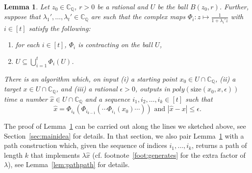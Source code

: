 \documentclass[11pt]{article}
\newtheorem{lemma}[theorem]{Lemma}
\def\CQ{\mathbb{C}_{\mathbb{Q}}}
\newcommand{\size}[1]{\mathrm{size}(#1)}
\newcommand{\eps}{\epsilon}
\begin{document}
\newcommand{\statelemprecision}{Let $z_0\in \CQ$, $r>0$ be a rational and $U$ be the ball $B(z_0,r)$. Further, suppose that   $\lambda_1',\hdots,\lambda_t'\in \CQ$ are such that the complex maps $\Phi_i:z\mapsto \frac{1}{1+\lambda_i' z}$ with $i\in[t]$ satisfy the following:
\begin{enumerate}
\item for each $i\in[t]$, $\Phi_i$ is contracting on  the ball $U$,
\item $U\subseteq \bigcup^{t}_{i=1}\Phi_i(U)$.
\end{enumerate}
There is an algorithm which, on input (i) a starting point $x_0\in U\cap \CQ$, (ii) a target $x\in U\cap \CQ$,  and (iii) a rational $\epsilon>0$, outputs in $poly(\size{x_0,x,\eps})$ time a number $\hat{x}\in U\cap \CQ$ and  a sequence $i_1,i_2,\hdots,i_k\in [t]$ such that  
\[\hat{x}=\Phi_{i_k}(\Phi_{i_{k-1}}(\cdots\Phi_{i_1}(x_0)\cdots))\mbox{ and }|\hat{x}-x|\leq \epsilon.\]}
\begin{lemma}\label{lem:precision}
\statelemprecision
\end{lemma}
The proof of Lemma~\ref{lem:precision} can be carried out along the lines we sketched above, see Section~\ref{sec:mainidea} for details.  In that section, we also pair Lemma~\ref{lem:precision} with a path construction which, given the sequence of indices  $i_1,\hdots,i_k$, returns a path of length $k$ that implements $\lambda \hat{x}$ (cf. footnote~\ref{foot:generates} for the extra factor of $\lambda$), see Lemma~\ref{lem:pathpath} for details. 
\end{document}
